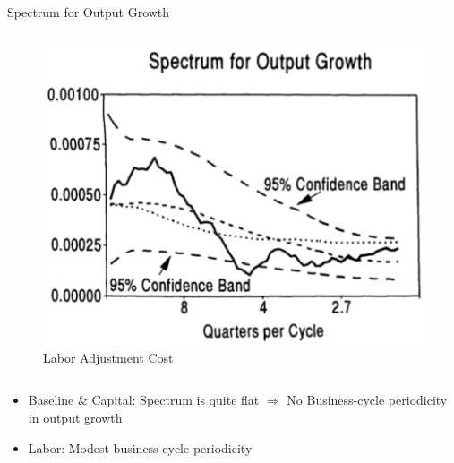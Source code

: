 \documentclass[10pt]{beamer}
\begin{document}
\begin{frame}{Spectrum for Output Growth}
\begin{columns}[T,onlytextwidth]
        \begin{figure}
            \centering
            \includegraphics[width=\linewidth]{figures/L_spect.png}
            \caption{Labor Adjustment Cost}
        \end{figure}
    \end{columns}

    \begin{itemize}
        \item Baseline \& Capital: Spectrum is quite flat $\Rightarrow$ No Business-cycle
              periodicity in output growth
        \item Labor: Modest business-cycle periodicity
    \end{itemize}

\end{frame}
\end{document}
